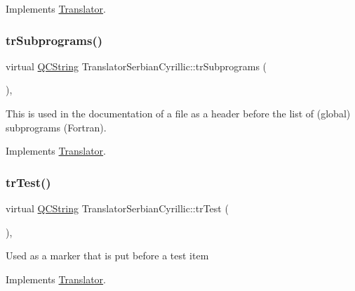 Implements \mbox{\hyperlink{class_translator}{Translator}}.

\mbox{\label{class_translator_serbian_cyrillic_a13c7629bcb37b472e4601a42ac30af47}} 
\subsubsection{\texorpdfstring{trSubprograms()}{trSubprograms()}}
{\footnotesize\ttfamily virtual \mbox{\hyperlink{class_q_c_string}{Q\+C\+String}} Translator\+Serbian\+Cyrillic\+::tr\+Subprograms (\begin{DoxyParamCaption}{ }\end{DoxyParamCaption})\hspace{0.3cm}{\ttfamily [inline]}, {\ttfamily [virtual]}}

This is used in the documentation of a file as a header before the list of (global) subprograms (Fortran). 

Implements \mbox{\hyperlink{class_translator}{Translator}}.

\mbox{\label{class_translator_serbian_cyrillic_abcd9eac8a07dc71bc67d75504e5f5fba}} 
\subsubsection{\texorpdfstring{trTest()}{trTest()}}
{\footnotesize\ttfamily virtual \mbox{\hyperlink{class_q_c_string}{Q\+C\+String}} Translator\+Serbian\+Cyrillic\+::tr\+Test (\begin{DoxyParamCaption}{ }\end{DoxyParamCaption})\hspace{0.3cm}{\ttfamily [inline]}, {\ttfamily [virtual]}}

Used as a marker that is put before a test item 

Implements \mbox{\hyperlink{class_translator}{Translator}}.

\mbox{\label{class_translator_serbian_cyrillic_aba8a9441f333d4b798e1792422d22b87}} 
